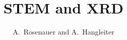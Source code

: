 \documentclass{beamer}
\title[STEM and XRD, GaInN/GaN QWs]{%
  STEM and XRD%
}
\author[Institute of Applied Physics,
  Technische Universität Braunschweig, Germany]{%
    A.~Rosenauer\inst{2} and A.~Hangleiter\inst{1}}
\begin{document}
\begin{frame}[plain]
  \maketitle
\end{frame}
\end{document}
